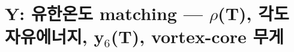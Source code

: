 \section{Y: 유한온도 matching — \ensuremath{\rho}(T), 각도 자유에너지, y\ensuremath{_{6}}(T), vortex-core 무게}

